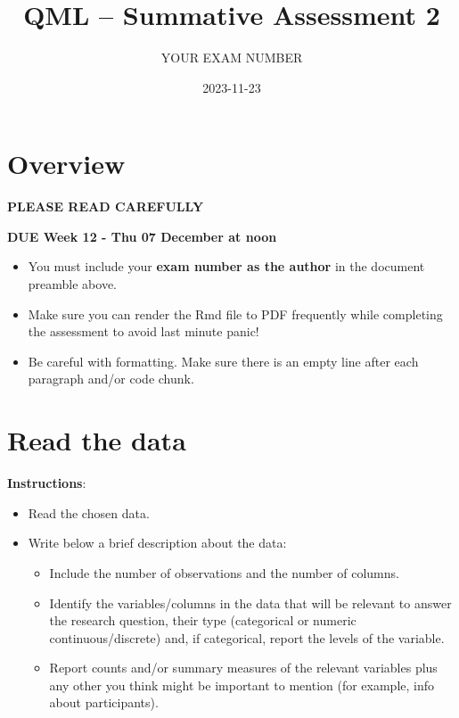 \documentclass[
]{article}
\title{QML -- Summative Assessment 2}
\author{YOUR EXAM NUMBER}
\date{2023-11-23}
\providecommand{\tightlist}{%
  \setlength{\itemsep}{0pt}\setlength{\parskip}{0pt}}
\begin{document}
\maketitle

{
\setcounter{tocdepth}{2}
\tableofcontents
}
\section{Overview}\label{overview}

\textbf{PLEASE READ CAREFULLY}

\textbf{DUE Week 12 - Thu 07 December at noon}

\begin{itemize}
\tightlist
\item
  You must include your \textbf{exam number as the author} in the
  document preamble above.
\item
  Make sure you can render the Rmd file to PDF frequently while
  completing the assessment to avoid last minute panic!
\item
  Be careful with formatting. Make sure there is an empty line after
  each paragraph and/or code chunk.
\end{itemize}

\section{Read the data}\label{read-the-data}

\textbf{Instructions}:

\begin{itemize}
\tightlist
\item
  Read the chosen data.
\item
  Write below a brief description about the data:

  \begin{itemize}
  \tightlist
  \item
    Include the number of observations and the number of columns.
  \item
    Identify the variables/columns in the data that will be relevant to
    answer the research question, their type (categorical or numeric
    continuous/discrete) and, if categorical, report the levels of the
    variable.
  \item
    Report counts and/or summary measures of the relevant variables plus
    any other you think might be important to mention (for example, info
    about participants).
  \end{itemize}
\end{itemize}
\end{document}
